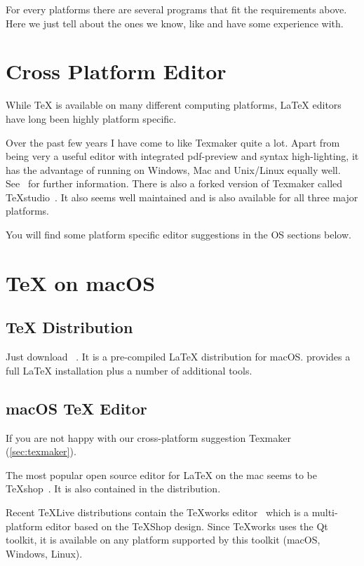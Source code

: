 For every platforms there are several programs that fit the requirements above.
Here we just tell about the ones we know, like and have some experience
with.

\section{Cross Platform Editor}\label{sec:texmaker}

While \TeX{} is available on many different computing platforms, \LaTeX{}
editors have long been highly platform specific.

Over the past few years I have come to like Texmaker quite a lot.
Apart from being very a useful editor with integrated pdf-preview and syntax
high-lighting, it has the advantage of running on Windows, Mac and
Unix/Linux equally well.  See~\cite{texmaker} for
further information.  There is also a forked version of Texmaker called
TeXstudio~\cite{texstudio}.  It also seems well
maintained and is also available for all three major platforms.

You will find some platform specific editor suggestions in the OS sections
below.

\section{\TeX{} on macOS}

\subsection{\TeX{} Distribution}

Just download ~\cite{mactex}. It is a
pre-compiled \LaTeX{} distribution for macOS\@.  provides a full \LaTeX{}
installation plus a number of additional tools.

\subsection{macOS \TeX{} Editor}

If you are not happy with our cross-platform suggestion Texmaker (\autoref{sec:texmaker}).

The most popular open source editor for \LaTeX{} on the mac seems to be
\TeX{}shop~\cite{texshop}. It
is also contained in the  distribution.

Recent \TeX{}Live distributions contain the \TeX{}works editor~\cite{texworks}
which is a multi-platform editor based on the \TeX{}Shop
design. Since \TeX{}works uses the Qt toolkit, it is available on any platform
supported by this toolkit (macOS, Windows, Linux).

